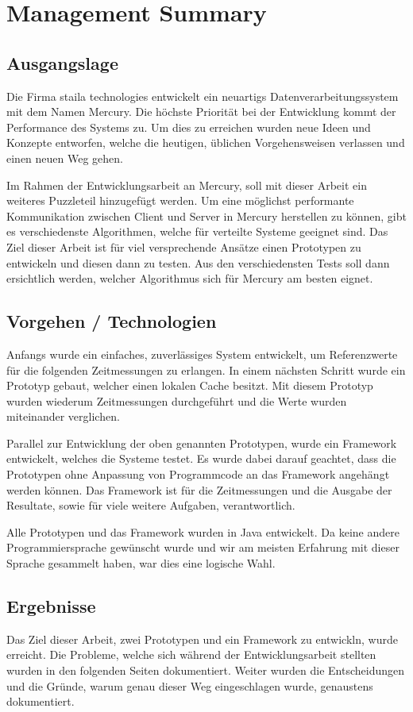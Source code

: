 \chapter*{Management Summary}

\section*{Ausgangslage}
Die Firma staila technologies ent\-wick\-elt ein neuartigs Daten\-ver\-arbeitungs\-system mit dem Namen Mercury. Die höchste Priorität bei der Entwicklung kommt der Performance des Systems zu. Um dies zu erreichen wurden neue Ideen und Konzepte entworfen, welche die heutigen, üblichen Vorgehensweisen verlassen und einen neuen Weg gehen.

Im Rahmen der Entwicklungsarbeit an Mercury, soll mit dieser Arbeit ein weiteres Puzzleteil hinzugefügt werden. Um eine möglichst performante Kommunikation zwischen Client und Server in Mercury herstellen zu können, gibt es verschiedenste Algorithmen, welche für verteilte Systeme geeignet sind. Das Ziel dieser Arbeit ist für viel versprechende Ansätze einen Prototypen zu entwickeln und diesen dann zu testen. Aus den verschiedensten Tests soll dann ersichtlich werden, welcher Algorithmus sich für Mercury am besten eignet.

\section*{Vorgehen / Technologien}
Anfangs wurde ein einfaches, zuverlässiges System entwickelt, um Referenzwerte für die folgenden Zeitmessungen zu erlangen. In einem nächsten Schritt wurde ein Prototyp gebaut, welcher einen lokalen Cache besitzt. Mit diesem Prototyp wurden wiederum Zeitmessungen durchgeführt und die Werte wurden miteinander verglichen.

Parallel zur Ent\-wick\-lung der oben ge\-nannten Pro\-to\-typ\-en, wur\-de ein Frame\-work entwickelt, welches die Systeme testet. Es wurde dabei darauf geachtet, dass die Prototypen ohne Anpassung von Programmcode an das Framework angehängt werden können. Das Framework ist für die Zeitmessungen und die Ausgabe der Resultate, sowie für viele weitere Aufgaben, verantwortlich.

Alle Prototypen und das Framework wurden in Java entwickelt. Da keine andere Programmiersprache gewünscht wurde und wir am meisten Erfahrung mit dieser Sprache gesammelt haben, war dies eine logische Wahl.
\section*{Ergebnisse}
Das Ziel dieser Arbeit, zwei Prototypen und ein Framework zu entwickln, wurde erreicht. Die Probleme, welche sich während der Entwicklungsarbeit stellten wurden in den folgenden Seiten dokumentiert. Weiter wurden die Entscheidungen und die Gründe, warum genau dieser Weg eingeschlagen wurde, genaustens dokumentiert.

